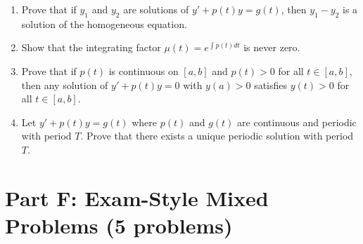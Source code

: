 \documentclass[12pt]{article}
\begin{document}
\begin{enumerate}[resume]
\item Prove that if $y_1$ and $y_2$ are solutions of $y' + p(t)y = g(t)$, then $y_1 - y_2$ is a solution of the homogeneous equation.

\item Show that the integrating factor $\mu(t) = e^{\int p(t)dt}$ is never zero.

\item Prove that if $p(t)$ is continuous on $[a,b]$ and $p(t) > 0$ for all $t \in [a,b]$, then any solution of $y' + p(t)y = 0$ with $y(a) > 0$ satisfies $y(t) > 0$ for all $t \in [a,b]$.

\item Let $y' + p(t)y = g(t)$ where $p(t)$ and $g(t)$ are continuous and periodic with period $T$. Prove that there exists a unique periodic solution with period $T$.
\end{enumerate}

\section*{Part F: Exam-Style Mixed Problems (5 problems)}
\end{document}
